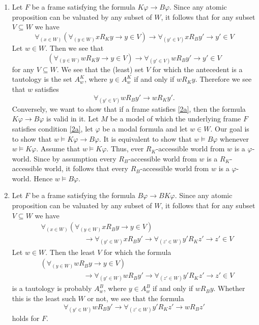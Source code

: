 \documentclass{article}
\begin{document}
\begin{ex}
\begin{enumerate}
\item Let $F$ be a frame satisfying the formula $K\varphi\to B\varphi$. Since
any atomic proposition can be valuated by any subset of $W$, it follows that
for any subset $V\subseteq W$ we have
\begin{equation*}
\forall_{(x\in W)} (\forall_{(y\in W)} x\mathbin{R_K} y\to y\in V)\to\forall_{(y'\in V)} x\mathbin{R_B} y'\to y'\in V
\end{equation*}
Let $w\in W$. Then we see that
\begin{equation*}
(\forall_{(y\in W)} w\mathbin{R_K} y\to y\in V)\to\forall_{(y'\in V)} w\mathbin{R_B} y'\to y'\in V
\end{equation*}
for any $V\subseteq W$. We see that the (least) set $V$ for which the antecedent is a tautology
is the set $A^K_w$, where $y\in A^K_w$ if and only if $w\mathbin{R_K}y$. Therefore
we see that $w$ satisfies
\begin{equation}\label{2a}
\forall_{(y'\in V)} w\mathbin{R_B} y'\to w\mathbin{R_K} y'.
\end{equation}
Conversely, we want to show that if a frame satisfies \ref{2a}, then the formula
$K\varphi\to B\varphi$ is valid in it. Let $M$ be a model of which the underlying
frame $F$ satisfies condition \ref{2a}, let $\varphi$ be a modal formula and let
$w\in W$. Our goal is to show that $w\models K\varphi\to B\varphi$. It is
equivalent to show that $w\models B\varphi$ whenever $w\models K\varphi$. Assume
that $w\models K\varphi$. Thus, ever $R_K$-accessible world from $w$ is a
$\varphi$-world. Since by assumption every $R_B$-accessible world from $w$ is
a $R_K$-accessible world, it follows that every $R_B$-accessible world from $w$
is a $\varphi$-world. Hence $w\models B\varphi$.
\item Let $F$ be a frame satisfying the formula $B\varphi\to BK\varphi$. Since
any atomic proposition can be valuated by any subset of $W$, it follows that
for any subset $V\subseteq W$ we have
\begin{align*}
& \forall_{(x\in W)}(\forall_{(y\in W)} x\mathbin{R_B} y\to y\in V)
  \\
  & \qquad\qquad\qquad\to
\forall_{(y'\in W)} x\mathbin{R_B} y'\to\forall_{(z'\in W)} y'\mathbin{R_K} z'\to z'\in V
\end{align*}
Let $w\in W$. Then the least $V$ for which the formula
\begin{align*}
& (\forall_{(y\in W)} w\mathbin{R_B} y\to y\in V)
  \\
  & \qquad\qquad\qquad\to
\forall_{(y'\in W)} w\mathbin{R_B} y'\to\forall_{(z'\in W)} y'\mathbin{R_K} z'\to z'\in V
\end{align*}
is a tautology is probably $A^B_w$, where $y\in A^B_w$ if and only if $w\mathbin{R_B} y$.
Whether this is the least such $W$ or not, we see that the formula
\begin{equation}\label{2b}
\forall_{(y'\in W)} w\mathbin{R_B} y'\to\forall_{(z'\in W)} y'\mathbin{R_K} z'\to w\mathbin{R_B} z'
\end{equation}
holds for $F$.


\end{enumerate}
\end{ex}
\end{document}
